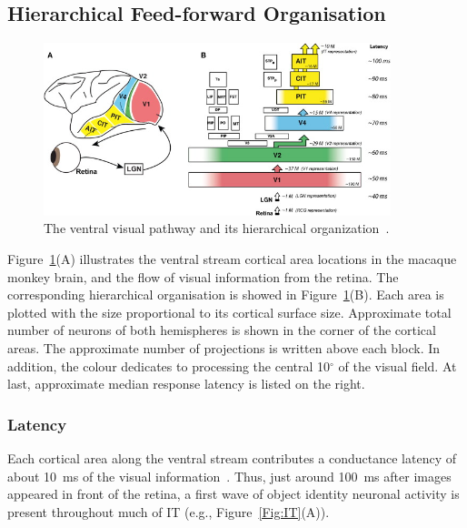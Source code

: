 \subsection{Hierarchical Feed-forward Organisation }

\begin{figure}[h!]
	\centering
	\includegraphics[width=0.9\textwidth]{pics_report/ventral.jpg}
	\caption{The ventral visual pathway and its hierarchical organization~\cite{dicarlo2012does}.
}
	\label{Fig:Ventral}
\end{figure}
Figure~\ref{Fig:Ventral}(A) illustrates the ventral stream cortical area locations in the macaque monkey brain, and the flow of visual information from the retina.
The corresponding hierarchical organisation is showed in Figure~\ref{Fig:Ventral}(B).
Each area is plotted with the size proportional to its cortical surface size.
Approximate total number of neurons of both hemispheres is shown in the corner of the cortical areas.
The approximate number of projections is written above each block.
In addition, the colour dedicates to processing the central 10$^\circ$ of the visual field.
At last, approximate median response latency is listed on the right.
\subsubsection{Latency}
Each cortical area along the ventral stream contributes a conductance latency of about 10~ms of the visual information~\cite{nowak1997timing}.
Thus, just around 100~ms after images appeared in front of the retina, a first wave of object identity neuronal activity is present throughout much of IT (e.g., Figure~\ref{Fig:IT}(A)).

